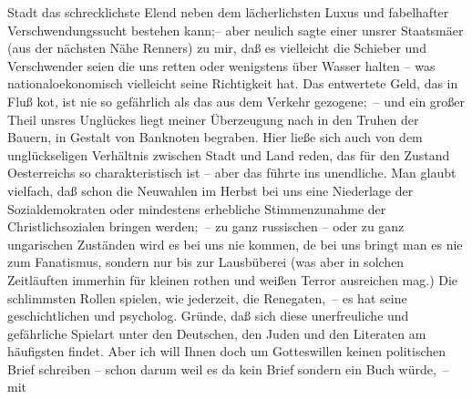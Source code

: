 \begin{ledgroupsized}[t]{13cm}
                    Stadt das schrecklichste Elend neben dem lächerlichsten Luxus und fabelhafter
                    Verschwendungssucht bestehen kann;– aber neulich sagte einer unsrer Staatsmä{\geminationn}er (aus der nächsten Nähe Renners) zu mir, daß es vielleicht die
                    Schieber und Verschwender seien die uns retten oder wenigstens über Wasser
                    halten – was nationaloekonomisch vielleicht seine Richtigkeit hat. Das
                    entwertete Geld, das in Fluß ko{\geminationm}t, ist nie so
                    gefährlich als das aus dem Verkehr gezogene; – und ein großer Theil unsres
                    Unglückes liegt meiner Überzeugung nach in den Truhen der Bauern, in Gestalt von
                    Banknoten begraben. Hier ließe sich auch von dem unglückseligen Verhältnis
                    zwischen Stadt {\pb}und Land reden, das für den
                    Zustand Oesterreichs so charakteristisch ist
                    – aber das führte ins unendliche. Man glaubt vielfach, daß schon die Neuwahlen
                    im Herbst bei uns eine Niederlage der Sozialdemokraten oder mindestens
                    erhebliche Stimmenzunahme der Christlichsozialen bringen werden; – zu ganz russischen – oder zu ganz ungarischen Zuständen wird es bei uns nie kommen, de{\geminationn} bei uns bringt man \strikeout{\textcolor{gray}{×}\-\textcolor{gray}{×}} es nie zum Fanatismus, sondern nur \introOben{}bis\introOben{} zur
                    Lausbüberei (was aber in solchen Zeitläuften immerhin für kleinen rothen und
                    weißen Terror ausreichen mag.) Die schlimmsten Rollen spielen, wie jederzeit,
                    die Renegaten, – es hat seine geschichtlichen \introOben{}und
                        psycholog.\introOben{} Gründe, daß sich diese \introOben{}unerfreuliche und
                        gefährliche\introOben{} Spielart unter den Deutschen, den Juden und den Literaten
                    am häufigsten findet.\pend
           \pstart
           {\pb}Aber ich will Ihnen doch um Gotteswillen
                    keinen politischen Brief schreiben – schon darum weil es da{\geminationn} kein Brief sondern ein Buch würde, – mit

\end{ledgroupsized}
